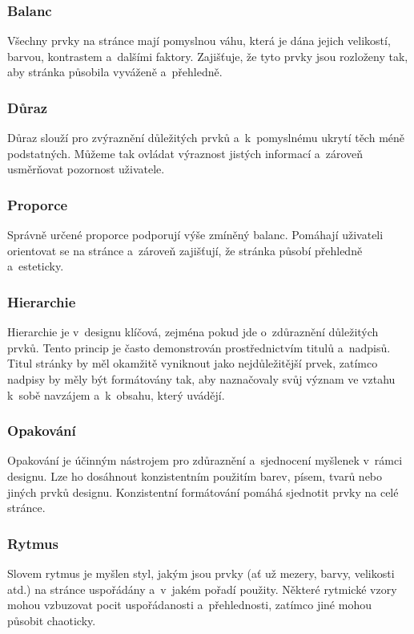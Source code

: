 \subsubsection*{Balanc}
Všechny prvky na stránce mají pomyslnou váhu, která je dána jejich velikostí, barvou, kontrastem a~dalšími faktory. Zajišťuje, že tyto prvky jsou rozloženy tak, aby stránka působila vyváženě a~přehledně.

\subsubsection*{Důraz}
Důraz slouží pro zvýraznění důležitých prvků a~k~pomyslnému ukrytí těch méně podstatných. Můžeme tak ovládat výraznost jistých informací a~zároveň usměrňovat pozornost uživatele.

\subsubsection*{Proporce}
Správně určené proporce podporují výše zmíněný balanc. Pomáhají uživateli orientovat se na stránce a~zároveň zajišťují, že stránka působí přehledně a~esteticky.

\subsubsection*{Hierarchie}
Hierarchie je v~designu klíčová, zejména pokud jde o~zdůraznění důležitých prvků. Tento princip je často demonstrován prostřednictvím titulů a~nadpisů. Titul stránky by měl okamžitě vyniknout jako nejdůležitější prvek, zatímco nadpisy by měly být formátovány tak, aby naznačovaly svůj význam ve vztahu k~sobě navzájem a~k~obsahu, který uvádějí.

\subsubsection*{Opakování}
Opakování je účinným nástrojem pro zdůraznění a~sjednocení myšlenek v~rámci designu. Lze ho dosáhnout konzistentním použitím barev, písem, tvarů nebo jiných prvků designu. Konzistentní formátování pomáhá sjednotit prvky na celé stránce.

\subsubsection*{Rytmus}
Slovem rytmus je myšlen styl, jakým jsou prvky (ať už mezery, barvy, velikosti atd.) na stránce uspořádány a~v~jakém pořadí použity. Některé rytmické vzory mohou vzbuzovat pocit uspořádanosti a~přehlednosti, zatímco jiné mohou působit chaoticky.

